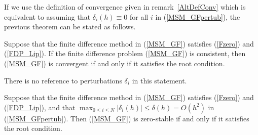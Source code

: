 \begin{rmk}
If we use the definition of convergence given in
remark~\ref{AltDefConv} which is equivalent to assuming that
$\delta_i(h) \equiv 0$ for all $i$ in (\ref{MSM_GFpertub}), the
previous theorem can be stated as follows.

Suppose that the finite difference method in (\ref{MSM_GF}) satisfies
(\ref{Fzero}) and (\ref{FDP_Lip}).  If the finite difference
problem (\ref{MSM_GF}) is consistent, then (\ref{MSM_GF}) is convergent
if and only if it satisfies the root condition.

There is no reference to perturbations $\delta_i$ in this statement.
\label{DahlquistWOdelta}
\end{rmk}

\begin{theorem}
Suppose that the finite difference method in (\ref{MSM_GF}) satisfies
(\ref{Fzero}) and (\ref{FDP_Lip}), and that
$\displaystyle \max_{0 \leq i \leq N} | \delta_i(h) | \leq
\delta(h) = O(h^2)$ in (\ref{MSM_GFpertub}).
Then (\ref{MSM_GF}) is zero-stable if and only if it satisfies the
root condition.
\end{theorem}

